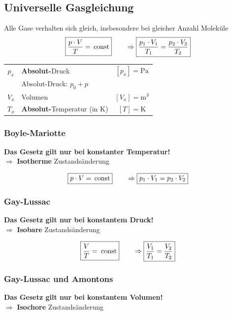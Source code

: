\subsection{Universelle Gasgleichung}
Alle Gase verhalten sich gleich, insbesondere bei gleicher Anzahl Moleküle \\


$$ \boxed{ \frac{p \cdot V}{T} = \, \mathrm{const} } \qquad  \Rightarrow \boxed{ \frac{p_1 \cdot V_1}{T_1} = \frac{p_2 \cdot V_2}{T_2} } $$ 


\begin{tabular}{c l c}
	$p_x$ & \textbf{Absolut-}Druck & $[p_x] = \mathrm{Pa}$ \\
	& Absolut-Druck: $p_0 + p$ \\
	$V_x$ & Volumen & $[V_x] = \mathrm{m^3}$ \\
	$T_x$ & \textbf{Absolut-}Temperatur (in K) & $[T] = \mathrm{K}$ \\
\end{tabular}
	

	
\subsubsection{Boyle-Mariotte}	
\textbf{Das Gesetz gilt nur bei konstanter Temperatur!} \\
$\Rightarrow$ \textbf{Isotherme} Zustandsänderung

$$  \boxed{ p \cdot V = \, \mathrm{const} } \qquad  \Rightarrow  \boxed{ p_1 \cdot V_1 = p_2 \cdot V_2 } $$ 





\subsubsection{Gay-Lussac}

\textbf{ Das Gesetz gilt nur bei konstantem Druck!} \\
$\Rightarrow$ \textbf{Isobare} Zustandsänderung

$$  \boxed{ \frac{V}{T} = \; \mathrm{const} } \qquad  \Rightarrow  \boxed{ \frac{V_1}{T_1} = \frac{V_2}{T_2} } $$


	
	
\subsubsection{Gay-Lussac und Amontons}

\textbf{Das Gesetz gilt nur bei konstantem Volumen!} \\
$\Rightarrow$ \textbf{Isochore} Zustandsänderung

